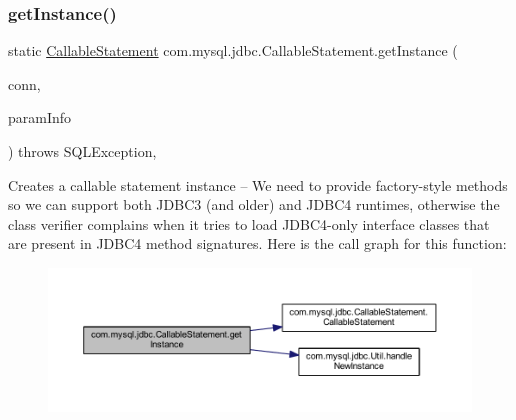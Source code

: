 \subsubsection{\texorpdfstring{get\+Instance()}{getInstance()}\hspace{0.1cm}{\footnotesize\ttfamily [2/2]}}
{\footnotesize\ttfamily static \mbox{\hyperlink{classcom_1_1mysql_1_1jdbc_1_1_callable_statement}{Callable\+Statement}} com.\+mysql.\+jdbc.\+Callable\+Statement.\+get\+Instance (\begin{DoxyParamCaption}\item[{\mbox{\hyperlink{interfacecom_1_1mysql_1_1jdbc_1_1_my_s_q_l_connection}{My\+S\+Q\+L\+Connection}}}]{conn,  }\item[{\mbox{\hyperlink{classcom_1_1mysql_1_1jdbc_1_1_callable_statement_1_1_callable_statement_param_info}{Callable\+Statement\+Param\+Info}}}]{param\+Info }\end{DoxyParamCaption}) throws S\+Q\+L\+Exception\hspace{0.3cm}{\ttfamily [static]}, {\ttfamily [protected]}}

Creates a callable statement instance -- We need to provide factory-\/style methods so we can support both J\+D\+B\+C3 (and older) and J\+D\+B\+C4 runtimes, otherwise the class verifier complains when it tries to load J\+D\+B\+C4-\/only interface classes that are present in J\+D\+B\+C4 method signatures. Here is the call graph for this function\+:\nopagebreak
\begin{figure}[H]
\begin{center}
\leavevmode
\includegraphics[width=350pt]{classcom_1_1mysql_1_1jdbc_1_1_callable_statement_a1333dd5bd813e16fd179c31927c46c83_cgraph}
\end{center}
\end{figure}
\mbox{\label{classcom_1_1mysql_1_1jdbc_1_1_callable_statement_a43b66c9bcf8be39ba1d4b5a05fbbfc0f}} 
